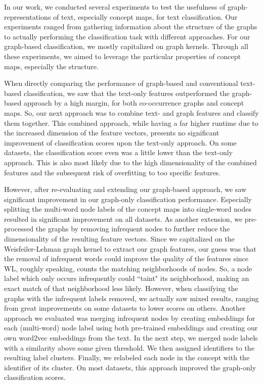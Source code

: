 In our work, we conducted several experiments to test the usefulness of graph-representations of text, especially concept maps, for text classification.
Our experiments ranged from gathering information about the structure of the graphs to actually performing the classification task with different approaches.
For our graph-based classification, we mostly capitalized on graph kernels.
Through all these experiments, we aimed to leverage the particular properties of concept maps, especially the structure.

When directly comparing the performance of graph-based and conventional text-based classification, we saw that the text-only features outperformed the graph-based approach by a high margin, for both co-occurrence graphs and concept maps.
So, our next approach was to combine text- and graph features and classify them together.
This combined approach, while having a far higher runtime due to the increased dimension of the feature vectors, presents no significant improvement of classification scores upon the text-only approach.
On some datasets, the classification score even was a little lower than the text-only approach.
This is also most likely due to the high dimensionality of the combined features and the subsequent risk of overfitting to too specific features.

However, after re-evaluating and extending our graph-based approach, we saw significant improvement in our graph-only classification performance.
Especially splitting the multi-word node labels of the concept maps into single-word nodes resulted in significant improvement on all datasets.
As another extension, we pre-processed the graphs by removing infrequent nodes to further reduce the dimensionality of the resulting feature vectors.
Since we capitalized on the Weisfeiler-Lehman graph kernel to extract our graph features, our guess was that the removal of infrequent words could improve the quality of the features since WL, roughly speaking, counts the matching neighborhoods of nodes.
So, a node label which only occurs infrequently could ``taint" its neighborhood, making an exact match of that neighborhood less likely.
However, when classifying the graphs with the infrequent labels removed, we actually saw mixed results, ranging from great improvements on some datasets to lower scores on others.
Another approach we evaluated was merging infrequent nodes by creating embeddings for each (multi-word) node label using both pre-trained embeddings and creating our own word2vec embeddings from the text.
In the next step, we merged node labels with a similarity above some given threshold.
We then assigned identifiers to the resulting label clusters.
Finally, we relabeled each node in the concept with the identifier of its cluster.
On most datasets, this approach improved the graph-only classification scores.


